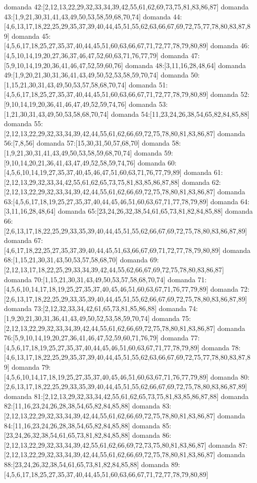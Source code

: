 domanda 42:[2,12,13,22,29,32,33,34,39,42,55,61,62,69,73,75,81,83,86,87]
domanda 43:[1,9,21,30,31,41,43,49,50,53,58,59,68,70,74]
domanda 44:[4,6,13,17,18,22,25,29,35,37,39,40,44,45,51,55,62,63,66,67,69,72,75,77,78,80,83,87,89]
domanda 45:[4,5,6,17,18,25,27,35,37,40,44,45,51,60,63,66,67,71,72,77,78,79,80,89]
domanda 46:[4,5,10,14,19,20,27,36,37,46,47,52,60,63,71,76,77,79]
domanda 47:[5,9,10,14,19,20,36,41,46,47,52,59,60,76]
domanda 48:[3,11,16,28,48,64]
domanda 49:[1,9,20,21,30,31,36,41,43,49,50,52,53,58,59,70,74]
domanda 50:[1,15,21,30,31,43,49,50,53,57,58,68,70,74]
domanda 51:[4,5,6,17,18,25,27,35,37,40,44,45,51,60,63,66,67,71,72,77,78,79,80,89]
domanda 52:[9,10,14,19,20,36,41,46,47,49,52,59,74,76]
domanda 53:[1,21,30,31,43,49,50,53,58,68,70,74]
domanda 54:[11,23,24,26,38,54,65,82,84,85,88]
domanda 55:[2,12,13,22,29,32,33,34,39,42,44,55,61,62,66,69,72,75,78,80,81,83,86,87]
domanda 56:[7,8,56]
domanda 57:[15,30,31,50,57,68,70]
domanda 58:[1,9,21,30,31,41,43,49,50,53,58,59,68,70,74]
domanda 59:[9,10,14,20,21,36,41,43,47,49,52,58,59,74,76]
domanda 60:[4,5,6,10,14,19,27,35,37,40,45,46,47,51,60,63,71,76,77,79,89]
domanda 61:[2,12,13,29,32,33,34,42,55,61,62,65,73,75,81,83,85,86,87,88]
domanda 62:[2,12,13,22,29,32,33,34,39,42,44,55,61,62,66,69,72,75,78,80,81,83,86,87]
domanda 63:[4,5,6,17,18,19,25,27,35,37,40,44,45,46,51,60,63,67,71,77,78,79,89]
domanda 64:[3,11,16,28,48,64]
domanda 65:[23,24,26,32,38,54,61,65,73,81,82,84,85,88]
domanda 66:[2,6,13,17,18,22,25,29,33,35,39,40,44,45,51,55,62,66,67,69,72,75,78,80,83,86,87,89]
domanda 67:[4,6,17,18,22,25,27,35,37,39,40,44,45,51,63,66,67,69,71,72,77,78,79,80,89]
domanda 68:[1,15,21,30,31,43,50,53,57,58,68,70]
domanda 69:[2,12,13,17,18,22,25,29,33,34,39,42,44,55,62,66,67,69,72,75,78,80,83,86,87]
domanda 70:[1,15,21,30,31,43,49,50,53,57,58,68,70,74]
domanda 71:[4,5,6,10,14,17,18,19,25,27,35,37,40,45,46,51,60,63,67,71,76,77,79,89]
domanda 72:[2,6,13,17,18,22,25,29,33,35,39,40,44,45,51,55,62,66,67,69,72,75,78,80,83,86,87,89]
domanda 73:[2,12,32,33,34,42,61,65,73,81,85,86,88]
domanda 74:[1,9,20,21,30,31,36,41,43,49,50,52,53,58,59,70,74]
domanda 75:[2,12,13,22,29,32,33,34,39,42,44,55,61,62,66,69,72,75,78,80,81,83,86,87]
domanda 76:[5,9,10,14,19,20,27,36,41,46,47,52,59,60,71,76,79]
domanda 77:[4,5,6,17,18,19,25,27,35,37,40,44,45,46,51,60,63,67,71,77,78,79,89]
domanda 78:[4,6,13,17,18,22,25,29,35,37,39,40,44,45,51,55,62,63,66,67,69,72,75,77,78,80,83,87,89]
domanda 79:[4,5,6,10,14,17,18,19,25,27,35,37,40,45,46,51,60,63,67,71,76,77,79,89]
domanda 80:[2,6,13,17,18,22,25,29,33,35,39,40,44,45,51,55,62,66,67,69,72,75,78,80,83,86,87,89]
domanda 81:[2,12,13,29,32,33,34,42,55,61,62,65,73,75,81,83,85,86,87,88]
domanda 82:[11,16,23,24,26,28,38,54,65,82,84,85,88]
domanda 83:[2,12,13,22,29,32,33,34,39,42,44,55,61,62,66,69,72,75,78,80,81,83,86,87]
domanda 84:[11,16,23,24,26,28,38,54,65,82,84,85,88]
domanda 85:[23,24,26,32,38,54,61,65,73,81,82,84,85,88]
domanda 86:[2,12,13,22,29,32,33,34,39,42,55,61,62,66,69,72,73,75,80,81,83,86,87]
domanda 87:[2,12,13,22,29,32,33,34,39,42,44,55,61,62,66,69,72,75,78,80,81,83,86,87]
domanda 88:[23,24,26,32,38,54,61,65,73,81,82,84,85,88]
domanda 89:[4,5,6,17,18,25,27,35,37,40,44,45,51,60,63,66,67,71,72,77,78,79,80,89]


